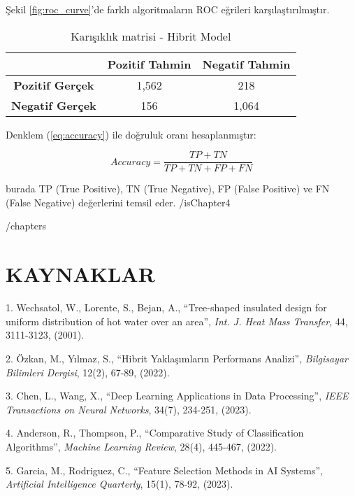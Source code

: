 \documentclass[12pt,a4paper,oneside]{report}
\begin{document}
Şekil \ref{fig:roc_curve}'de farklı algoritmaların ROC eğrileri karşılaştırılmıştır.

\begin{table}[h!]
\centering
\caption{Karışıklık matrisi - Hibrit Model}
\label{tab:confusion_matrix}
\begin{tabular}{|c|c|c|}
\hline
 & \textbf{Pozitif Tahmin} & \textbf{Negatif Tahmin} \\
\hline
\textbf{Pozitif Gerçek} & 1,562 & 218 \\
\textbf{Negatif Gerçek} & 156 & 1,064 \\
\hline
\end{tabular}
\end{table}

Denklem (\ref{eq:accuracy}) ile doğruluk oranı hesaplanmıştır:

\begin{equation}
Accuracy = \frac{TP + TN}{TP + TN + FP + FN}
\label{eq:accuracy}
\end{equation}

burada TP (True Positive), TN (True Negative), FP (False Positive) ve FN (False Negative) değerlerini temsil eder.
{{/isChapter4}}

{{/chapters}}

\chapter*{KAYNAKLAR}

\singlespacing %

1. Wechsatol, W., Lorente, S., Bejan, A., ``Tree-shaped insulated design for uniform distribution of hot water over an area'', \textit{Int. J. Heat Mass Transfer}, 44, 3111-3123, (2001).

2. Özkan, M., Yılmaz, S., ``Hibrit Yaklaşımların Performans Analizi'', \textit{Bilgisayar Bilimleri Dergisi}, 12(2), 67-89, (2022).

3. Chen, L., Wang, X., ``Deep Learning Applications in Data Processing'', \textit{IEEE Transactions on Neural Networks}, 34(7), 234-251, (2023).

4. Anderson, R., Thompson, P., ``Comparative Study of Classification Algorithms'', \textit{Machine Learning Review}, 28(4), 445-467, (2022).

5. Garcia, M., Rodriguez, C., ``Feature Selection Methods in AI Systems'', \textit{Artificial Intelligence Quarterly}, 15(1), 78-92, (2023).
\end{document}
